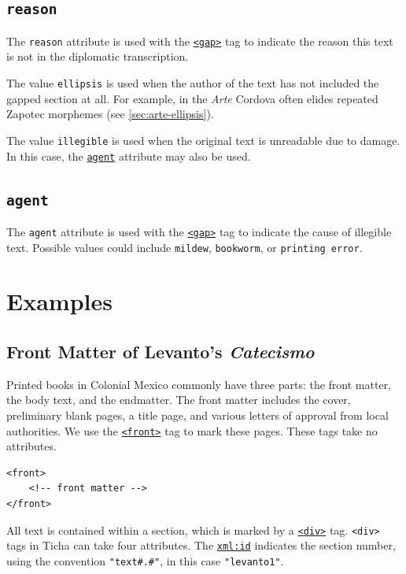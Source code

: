 \documentclass[12pt,a4paper]{article}
\begin{document}
\subsection{\texttt{reason}} \label{att-sec:reason}
The \texttt{reason} attribute is used with the \hyperref[tag-sec:gap]{\texttt{<gap>}} tag to indicate the reason this text is not in the diplomatic transcription.

The value \texttt{ellipsis} is used when the author of the text has not included the gapped section at all.  For example, in the \emph{Arte} Cordova often elides repeated Zapotec morphemes (see \hyperref[sec:arte-ellipsis]{\ref{sec:arte-ellipsis}}).

The value \texttt{illegible} is used when the original text is unreadable due to damage.  In this case, the \hyperref[att-sec:agent]{\texttt{agent}} attribute may also be used.

\subsection{\texttt{agent}} \label{att-sec:agent}

The \texttt{agent} attribute is used with the \hyperref[tag-sec:gap]{\texttt{<gap>}} tag to indicate the cause of illegible text.  Possible values could include \texttt{mildew}, \texttt{bookworm}, or \texttt{printing error}.

\section{Examples}

\subsection{Front Matter of Levanto's \emph{Catecismo}}

Printed books in Colonial Mexico commonly have three parts: the front matter, the body text, and the endmatter.  The front matter includes the cover, preliminary blank pages, a title page, and various letters of approval from local authorities.  We use the \hyperref[tag-sec:frontbodyback]{\texttt{<front>}} tag to mark these pages.  These tags take no attributes.

\begin{lstlisting}
<front>
	<!-- front matter -->
</front>
\end{lstlisting}

All text is contained within a section, which is marked by a \hyperref[tag-sec:div]{\texttt{<div>}} tag.  \texttt{<div>} tags in Ticha can take four attributes.  The \hyperref[att-sec:xml:id]{\texttt{xml:id}} indicates the section number, using the convention \texttt{"text\#.\#"}, in this case \texttt{"levanto1"}.  
\end{document}
